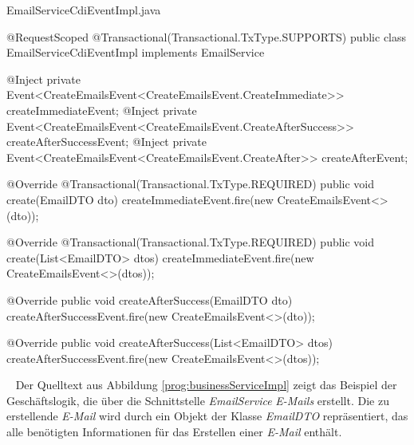 \begin{program}[h]
\caption{EmailServiceCdiEventImpl.java}
\label{prog:emailServiceCdiEventImpl}
\begin{JavaCode}
@RequestScoped
@Transactional(Transactional.TxType.SUPPORTS)
public class EmailServiceCdiEventImpl implements EmailService {
    @Inject
    private Event<CreateEmailsEvent<CreateEmailsEvent.CreateImmediate>> createImmediateEvent;
    @Inject
    private Event<CreateEmailsEvent<CreateEmailsEvent.CreateAfterSuccess>> createAfterSuccessEvent;
    @Inject
    private Event<CreateEmailsEvent<CreateEmailsEvent.CreateAfter>> createAfterEvent;

    @Override
    @Transactional(Transactional.TxType.REQUIRED)
    public void create(EmailDTO dto) {
        createImmediateEvent.fire(new CreateEmailsEvent<>(dto));
    }

    @Override
    @Transactional(Transactional.TxType.REQUIRED)
    public void create(List<EmailDTO> dtos) {
        createImmediateEvent.fire(new CreateEmailsEvent<>(dtos));
    }

    @Override
    public void createAfterSuccess(EmailDTO dto) {
        createAfterSuccessEvent.fire(new CreateEmailsEvent<>(dto));
    }

    @Override
    public void createAfterSuccess(List<EmailDTO> dtos) {
        createAfterSuccessEvent.fire(new CreateEmailsEvent<>(dtos));
    }
}
\end{JavaCode}
\end{program}
\ \newline
Der Quelltext aus Abbildung \ref{prog:businessServiceImpl} zeigt das Beispiel der Geschäftslogik, die über die Schnittstelle \emph{EmailService} \emph{E-Mails} erstellt. Die zu erstellende \emph{E-Mail} wird durch ein Objekt der Klasse \emph{EmailDTO} repräsentiert, das alle benötigten Informationen für das Erstellen einer \emph{E-Mail} enthält.
\newpage
